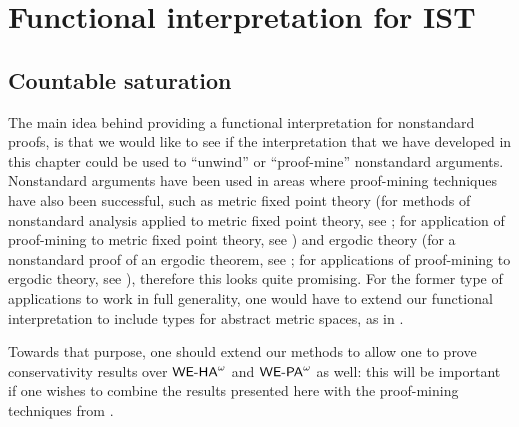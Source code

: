 \section{Functional interpretation for IST}







%




%

\subsection{Countable saturation}

The main idea behind providing a functional interpretation for nonstandard proofs, is that  we would like to see if the interpretation that we have developed in this chapter could be used to ``unwind'' or ``proof-mine'' nonstandard arguments. Nonstandard arguments have been used in areas where proof-mining techniques have also been successful, such as metric fixed point theory (for methods of nonstandard analysis applied to metric fixed point theory, see \cite{aksoykhamsi90, kirk03}; for application of proof-mining to metric fixed point theory, see \cite{briseid09, Gerhardy06, Kohlenbach05fpt, kohlenbachleustean03, kohlenbachleustean10, leustean07}) and ergodic theory (for a nonstandard proof of an ergodic theorem, see \cite{kamae82}; for applications of proof-mining to ergodic theory, see \cite{avigad09, AGT10, gerhardy08, Gerhardy2010, Kohlenbach2011, kohlenbachleustean09, Safarik(11)}), therefore this looks quite promising. For the former type of applications to work in full generality, one would have to extend our functional interpretation to include types for abstract metric spaces, as in \cite{GK08, Kohlenbach05meta}.

Towards that purpose, one should extend our methods to allow one to prove conservativity results over ${\textsf{\upshape WE-HA}}^{\omega}$ and ${\textsf{\upshape WE-PA}}^{\omega}$ as well: this will be important if one wishes to combine the results presented here with the proof-mining techniques from \cite{Kohlenbach08}. 

